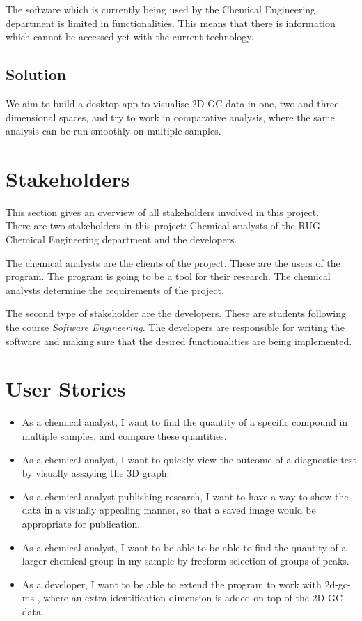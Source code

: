 \documentclass{article}
\begin{document}
The software which is currently being used by the Chemical Engineering department is limited in functionalities. This means that there is information which cannot be accessed yet with the current technology. 

\subsection*{Solution}
We aim to build a desktop app to visualise 2D-GC data in one, two and three dimensional spaces, and try to work in comparative analysis, where the same analysis can be run smoothly on multiple samples. 

\section{Stakeholders}

This section gives an overview of all stakeholders involved in this project. \\

\noindent There are two stakeholders in this project: Chemical analysts of the RUG Chemical Engineering department and the developers.

The chemical analysts are the clients of the project. These are the users of the program. The program is going to be a tool for their research. The chemical analysts determine the requirements of the project.

The second type of stakeholder are the developers. These are students following the course \textit{Software Engineering}. The developers are responsible for writing the software and making sure that the desired functionalities are being implemented.

\section{User Stories}
\begin{itemize}
	\item As a chemical analyst, I want to find the quantity of a specific compound in multiple samples, and compare these quantities. 
	\item As a chemical analyst, I want to quickly view the outcome of a diagnostic test by visually assaying the 3D graph. 
	\item As a chemical analyst publishing research, I want to have a way to show the data in a visually appealing manner, so that a saved image would be appropriate for publication. 
	\item As a chemical analyst, I want to be able to be able to find the quantity of a larger chemical group in my sample by freeform selection of groups of peaks. 
	\item As a developer, I want to be able to extend the program to work with \acrfull{2d-gc-ms} , where an extra identification dimension is added on top of the 2D-GC data. 
\end{itemize}
\end{document}

